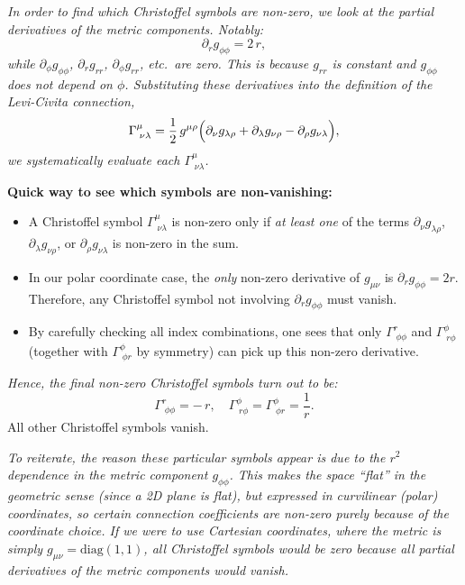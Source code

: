 \emph{In order to find which Christoffel symbols are non-zero, we look at the partial derivatives of the metric components. Notably:}
\[
\partial_r g_{\phi\phi} = 2\,r,
\]
\emph{while \(\partial_\phi g_{\phi\phi}\), \(\partial_r g_{rr}\), \(\partial_\phi g_{rr}\), etc.\ are zero. This is because \(g_{rr}\) is constant and \(g_{\phi\phi}\) does not depend on \(\phi\). Substituting these derivatives into the definition of the Levi-Civita connection,}
\[
\Gamma^\mu_{\;\nu\lambda}
=
\frac12\, g^{\mu\rho}
\Bigl(
\partial_\nu g_{\lambda\rho}
+
\partial_\lambda g_{\nu\rho}
-
\partial_\rho g_{\nu\lambda}
\Bigr),
\]
\emph{we systematically evaluate each \(\Gamma^\mu_{\;\nu\lambda}\).}

\textbf{Quick way to see which symbols are non-vanishing:}
\begin{itemize}
    \item A Christoffel symbol \(\Gamma^\mu_{\;\nu\lambda}\) is non-zero only if \emph{at least one} of the terms
    \(\partial_\nu g_{\lambda\rho}\), \(\partial_\lambda g_{\nu\rho}\), or \(\partial_\rho g_{\nu\lambda}\)
    is non-zero in the sum.
    \item In our polar coordinate case, the \emph{only} non-zero derivative of \(g_{\mu\nu}\) is
    \(\partial_r g_{\phi\phi} = 2r\). Therefore, any Christoffel symbol not involving \(\partial_r g_{\phi\phi}\) must vanish.
    \item By carefully checking all index combinations, one sees that only \(\Gamma^r_{\;\phi\phi}\) and \(\Gamma^\phi_{\;r\phi}\) (together with \(\Gamma^\phi_{\;\phi r}\) by symmetry) can pick up this non-zero derivative.
\end{itemize}

\emph{Hence, the final non-zero Christoffel symbols turn out to be:}
\[
\Gamma^r_{\;\phi\phi} = -\,r,
\quad
\Gamma^\phi_{\;r\phi} = \Gamma^\phi_{\;\phi r} = \frac{1}{r}.
\]
All other Christoffel symbols vanish.

\emph{To reiterate, the reason these particular symbols appear is due to the \(r^2\) dependence in the metric component \(g_{\phi\phi}\). This makes the space “flat” in the geometric sense (since a 2D plane is flat), but expressed in curvilinear (polar) coordinates, so certain connection coefficients are non-zero purely because of the coordinate choice. If we were to use Cartesian coordinates, where the metric is simply \(g_{\mu\nu} = \mathrm{diag}(1, 1)\), all Christoffel symbols would be zero because all partial derivatives of the metric components would vanish.}


